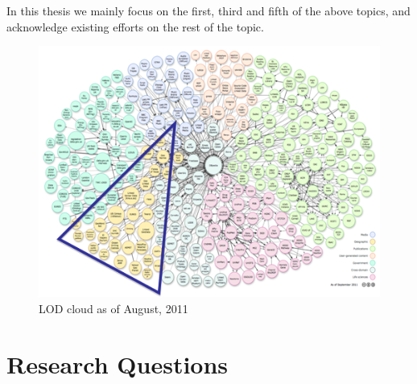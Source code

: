 In this thesis we mainly focus on the first, third and fifth of the above topics, and acknowledge existing efforts on the rest of the topic. 

\begin{figure}[ht!]
\includegraphics[scale=0.9]{img/lod-diagram-2011.png}
\caption{LOD cloud as of August, 2011}
\label{fig:lodcloud2011}
\end{figure}

\begin{figure}[ht!]
\end{figure}



\section{Research Questions}
\label{sec:questions}

